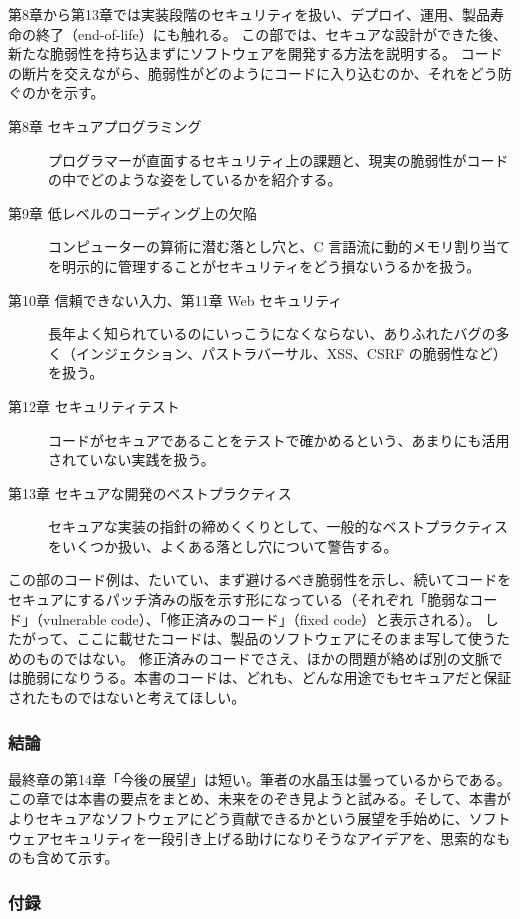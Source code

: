 \documentclass[uplatex]{jsarticle}
\begin{document}
第8章から第13章では実装段階のセキュリティを扱い、デプロイ、運用、製品寿命の終了（end-of-life）にも触れる。
この部では、セキュアな設計ができた後、新たな脆弱性を持ち込まずにソフトウェアを開発する方法を説明する。
コードの断片を交えながら、脆弱性がどのようにコードに入り込むのか、それをどう防ぐのかを示す。
\begin{description}
  \item[第8章 セキュアプログラミング] プログラマーが直面するセキュリティ上の課題と、現実の脆弱性がコードの中でどのような姿をしているかを紹介する。
  \item[第9章 低レベルのコーディング上の欠陥] コンピューターの算術に潜む落とし穴と、C 言語流に動的メモリ割り当てを明示的に管理することがセキュリティをどう損ないうるかを扱う。
  \item[第10章 信頼できない入力、第11章 Web セキュリティ] 長年よく知られているのにいっこうになくならない、ありふれたバグの多く（インジェクション、パストラバーサル、XSS、CSRF の脆弱性など）を扱う。
  \item[第12章 セキュリティテスト] コードがセキュアであることをテストで確かめるという、あまりにも活用されていない実践を扱う。
  \item[第13章 セキュアな開発のベストプラクティス] セキュアな実装の指針の締めくくりとして、一般的なベストプラクティスをいくつか扱い、よくある落とし穴について警告する。
\end{description}

この部のコード例は、たいてい、まず避けるべき脆弱性を示し、続いてコードをセキュアにするパッチ済みの版を示す形になっている（それぞれ「脆弱なコード」（vulnerable code）、「修正済みのコード」（fixed code）と表示される）。
したがって、ここに載せたコードは、製品のソフトウェアにそのまま写して使うためのものではない。
修正済みのコードでさえ、ほかの問題が絡めば別の文脈では脆弱になりうる。本書のコードは、どれも、どんな用途でもセキュアだと保証されたものではないと考えてほしい。

\subsubsection*{結論}

最終章の第14章「今後の展望」は短い。筆者の水晶玉は曇っているからである。
この章では本書の要点をまとめ、未来をのぞき見ようと試みる。そして、本書がよりセキュアなソフトウェアにどう貢献できるかという展望を手始めに、ソフトウェアセキュリティを一段引き上げる助けになりそうなアイデアを、思索的なものも含めて示す。

\subsubsection*{付録}
\end{document}
